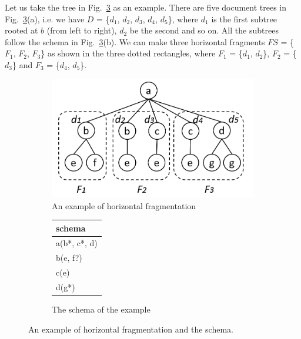 Let us take the tree in Fig.~\ref{fig:hfrag_example} as an example. There are
five document trees in Fig.~\ref{fig:hfrag_example}(a), i.e. we have $D$ =
\{$d_1$, $d_2$, $d_3$, $d_4$, $d_5$\}, where $d_1$ is  the first subtree rooted
at $b$ (from left to right), $d_2$ be the second and so on. All the subtrees
follow the schema in Fig.~\ref{fig:hfrag_example}(b). We can make three
horizontal fragments $FS$ = \{$F_1$, $F_2$, $F_3$\} as shown in the three dotted
rectangles, where $F_1$ = \{$d_1$, $d_2$\}, $F_2$ = \{$d_3$\} and  $F_3$ =
\{$d_4$, $d_5$\}.


\begin{figure}[t]
	\centering
	\begin{subfigure}{.6\textwidth}
		\centering
		\includegraphics[width=.99\linewidth]{figures/hfrag_example}
		\caption{An example of horizontal fragmentation}
		\label{fig:sub1}
	\end{subfigure}%
	\begin{subfigure}{.4\textwidth}
		\centering
		\vspace{12mm}
		\begin{tabular}{|l|}
			\hline
			schema\\
			\hline
			a(b*, c*, d) \\
			b(e, f?) \\
			c(e) \\
			d(g*) \\
			\hline
		\end{tabular}
		\vspace{12mm}
		\caption{The schema of the example}
		\label{fig:sub2}
	\end{subfigure}
	\caption{An example of horizontal fragmentation and the schema.}
	\label{fig:hfrag_example}
\end{figure}

